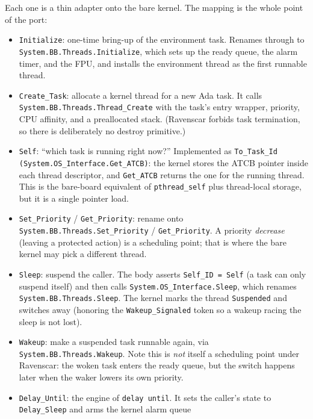 Each one is a thin adapter onto the bare kernel. The mapping is the whole point
of the port:

\begin{itemize}
  \item \texttt{Initialize}: one-time bring-up of the environment task.
        Renames through to \texttt{System.BB.Threads.Initialize}, which sets up
        the ready queue, the alarm timer, and the FPU, and installs the
        environment thread as the first runnable thread.
  \item \texttt{Create\_Task}: allocate a kernel thread for a new Ada task. It
        calls \texttt{System.BB.Threads.Thread\_Create} with the task's entry
        wrapper, priority, CPU affinity, and a preallocated stack. (Ravenscar
        forbids task termination, so there is deliberately no destroy
        primitive.)
  \item \texttt{Self}: ``which task is running right now?'' Implemented as
        \texttt{To\_Task\_Id (System.OS\_Interface.Get\_ATCB)}: the kernel
        stores the ATCB pointer inside each thread descriptor, and
        \texttt{Get\_ATCB} returns the one for the running thread. This is the
        bare-board equivalent of \texttt{pthread\_self} plus thread-local
        storage, but it is a single pointer load.
  \item \texttt{Set\_Priority} / \texttt{Get\_Priority}: rename onto
        \texttt{System.BB.Threads.Set\_Priority} / \texttt{Get\_Priority}. A
        priority \emph{decrease} (leaving a protected action) is a scheduling
        point; that is where the bare kernel may pick a different thread.
  \item \texttt{Sleep}: suspend the caller. The body asserts
        \texttt{Self\_ID = Self} (a task can only suspend itself) and then calls
        \texttt{System.OS\_Interface.Sleep}, which renames
        \texttt{System.BB.Threads.Sleep}. The kernel marks the thread
        \texttt{Suspended} and switches away (honoring the \texttt{Wakeup\_Signaled}
        token so a wakeup racing the sleep is not lost).
  \item \texttt{Wakeup}: make a suspended task runnable again, via
        \texttt{System.BB.Threads.Wakeup}. Note this is \emph{not} itself a
        scheduling point under Ravenscar: the woken task enters the ready queue,
        but the switch happens later when the waker lowers its own priority.
  \item \texttt{Delay\_Until}: the engine of \texttt{delay until}. It sets the
        caller's state to \texttt{Delay\_Sleep} and arms the kernel alarm queue

\end{itemize}
